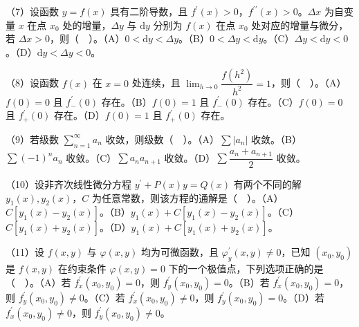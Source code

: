 \documentclass[UTF8,12pt]{ctexart}
\begin{document}
（7）设函数 \(\displaystyle y=f(x)\) 具有二阶导数，且 \(\displaystyle f^{\prime}(x)>0\)，\(\displaystyle f^{\prime\prime}(x)>0\)。\(\displaystyle \Delta x\) 为自变量 \(\displaystyle x\) 在点 \(\displaystyle x_0\) 处的增量，\(\displaystyle \Delta y\) 与 \(\displaystyle \mathrm dy\) 分别为 \(\displaystyle f(x)\) 在点 \(\displaystyle x_0\) 处对应的增量与微分，若 \(\displaystyle \Delta x>0\)，则（　）。（A）\(\displaystyle 0<\mathrm dy<\Delta y\)。（B）\(\displaystyle 0<\Delta y<\mathrm dy\)。（C）\(\displaystyle \Delta y<\mathrm dy<0\)。（D）\(\displaystyle \mathrm dy<\Delta y<0\)。


（8）设函数 \(\displaystyle f(x)\) 在 \(\displaystyle x=0\) 处连续，且 \(\displaystyle \lim_{h\to0}\dfrac{\displaystyle f(h^2)}{\displaystyle h^2}=1\)，则（　）。（A）\(\displaystyle f(0)=0\) 且 \(\displaystyle f^{\prime}_{-}(0)\) 存在。（B）\(\displaystyle f(0)=1\) 且 \(\displaystyle f^{\prime}_{-}(0)\) 存在。（C）\(\displaystyle f(0)=0\) 且 \(\displaystyle f^{\prime}_{+}(0)\) 存在。（D）\(\displaystyle f(0)=1\) 且 \(\displaystyle f^{\prime}_{+}(0)\) 存在。


（9）若级数 \(\displaystyle \sum_{n=1}^{\infty}a_n\) 收敛，则级数（　）。（A）\(\displaystyle \sum|a_n|\) 收敛。（B）\(\displaystyle \sum(-1)^na_n\) 收敛。（C）\(\displaystyle \sum a_na_{n+1}\) 收敛。（D）\(\displaystyle \sum\dfrac{\displaystyle a_n+a_{n+1}}{\displaystyle 2}\) 收敛。


（10）设非齐次线性微分方程 \(\displaystyle y^{\prime}+P(x)y=Q(x)\) 有两个不同的解 \(\displaystyle y_1(x),\allowbreak y_2(x)\)，\(\displaystyle C\) 为任意常数，则该方程的通解是（　）。（A）\(\displaystyle C[y_1(x)-y_2(x)]\)。（B）\(\displaystyle y_1(x)+C[y_1(x)-y_2(x)]\)。（C）\(\displaystyle C[y_1(x)+y_2(x)]\)。（D）\(\displaystyle y_1(x)+C[y_1(x)+y_2(x)]\)。


（11）设 \(\displaystyle f(x,\allowbreak y)\) 与 \(\displaystyle \varphi(x,\allowbreak y)\) 均为可微函数，且 \(\displaystyle \varphi_y^{\prime}(x,\allowbreak y)\ne0\)，已知 \(\displaystyle (x_0,\allowbreak y_0)\) 是 \(\displaystyle f(x,\allowbreak y)\) 在约束条件 \(\displaystyle \varphi(x,\allowbreak y)=0\) 下的一个极值点，下列选项正确的是（　）。（A）若 \(\displaystyle f_x^{\prime}(x_0,\allowbreak y_0)=0\)，则 \(\displaystyle f_y^{\prime}(x_0,\allowbreak y_0)=0\)。（B）若 \(\displaystyle f_x^{\prime}(x_0,\allowbreak y_0)=0\)，则 \(\displaystyle f_y^{\prime}(x_0,\allowbreak y_0)\ne0\)。（C）若 \(\displaystyle f_x^{\prime}(x_0,\allowbreak y_0)\ne0\)，则 \(\displaystyle f_y^{\prime}(x_0,\allowbreak y_0)=0\)。（D）若 \(\displaystyle f_x^{\prime}(x_0,\allowbreak y_0)\ne0\)，则 \(\displaystyle f_y^{\prime}(x_0,\allowbreak y_0)\ne0\)。
\end{document}
